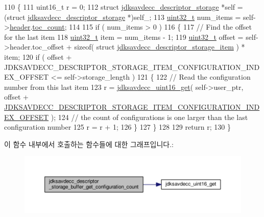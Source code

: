 \begin{DoxyCode}
110 \{
111     uint16\_t r = 0;
112     \textcolor{keyword}{struct }\hyperlink{structjdksavdecc__descriptor__storage}{jdksavdecc\_descriptor\_storage} *\textcolor{keyword}{self} = (\textcolor{keyword}{struct }
      \hyperlink{structjdksavdecc__descriptor__storage}{jdksavdecc\_descriptor\_storage} *)self\_;
113     \hyperlink{parse_8c_a6eb1e68cc391dd753bc8ce896dbb8315}{uint32\_t} num\_items = \textcolor{keyword}{self}->\hyperlink{structjdksavdecc__descriptor__storage_ab5243bc10c0547b567bfe308e571200e}{header}.\hyperlink{structjdksavdecc__descriptor__storage__header_a22c14d132b1eabf9f84417876ad8022b}{toc\_count};
114 
115     \textcolor{keywordflow}{if} ( num\_items > 0 )
116     \{
117         \textcolor{comment}{// Find the offset for the last item}
118         \hyperlink{parse_8c_a6eb1e68cc391dd753bc8ce896dbb8315}{uint32\_t} item = num\_items - 1;
119         \hyperlink{parse_8c_a6eb1e68cc391dd753bc8ce896dbb8315}{uint32\_t} offset = \textcolor{keyword}{self}->header.toc\_offset + \textcolor{keyword}{sizeof}( \textcolor{keyword}{struct }
      \hyperlink{structjdksavdecc__descriptor__storage__item}{jdksavdecc\_descriptor\_storage\_item} ) * item;
120         \textcolor{keywordflow}{if} ( offset + JDKSAVDECC\_DESCRIPTOR\_STORAGE\_ITEM\_CONFIGURATION\_INDEX\_OFFSET <= self->storage\_length
       )
121         \{
122             \textcolor{comment}{// Read the configuration number from this last item}
123             r = \hyperlink{group__endian_ga3fbbbc20be954aa61e039872965b0dc9}{jdksavdecc\_uint16\_get}( self->user\_ptr, offset + 
      \hyperlink{group__descriptor__storage__item_ga7206999291660720b4a417c04b96c57b}{JDKSAVDECC\_DESCRIPTOR\_STORAGE\_ITEM\_CONFIGURATION\_INDEX\_OFFSET}
       );
124             \textcolor{comment}{// the count of configurations is one larger than the last configuration number}
125             r = r + 1;
126         \}
127     \}
128 
129     \textcolor{keywordflow}{return} r;
130 \}
\end{DoxyCode}


이 함수 내부에서 호출하는 함수들에 대한 그래프입니다.\+:
\nopagebreak
\begin{figure}[H]
\begin{center}
\leavevmode
\includegraphics[width=350pt]{group__jdksavdecc__descriptor__storage_gaf481852d6558c9f414162824c93d781b_cgraph}
\end{center}
\end{figure}




